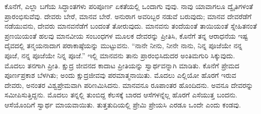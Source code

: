 ಕೊನೆಗೆ, ಎಲ್ಲಾ ಬಗೆಯ ಸಿದ್ಧಾಂತಗಳು ಪರಿಪೂರ್ಣ ಏಕತೆಯಲ್ಲಿ ಒಂದಾಗು ವುವು. ನಾವು ಯಾವಾಗಲೂ ದ್ವೈತಿಗಳಂತೆ ಪ್ರಾರಂಭಿಸುವೆವು. ದೇವರು ಬೇರೆ, ಮಾನವ ಬೇರೆ. ಅನುರಾಗ ಅವರಿಬ್ಬರ ನಡುವೆ ಬರುವುದು; ಮಾನವ ದೇವರೆಡೆಗೆ ನಡೆಯುವನು, ದೇವರು ಮಾನವನೆಡೆಗೆ ಬಂದಂತೆ ತೋರುವುದು. ಮಾನವನು ತಂದೆಯಂತೆ ತಾಯಿಯಂತೆ ಸ್ನೇಹಿತನಂತೆ ಪ್ರಣಯಿಯಂತೆ ಹಲವು ಮಾನವೀಯ ಸಂಬಂಧಗಳ ಮೂಲಕ ದೇವರನ್ನು ಪ್ರೀತಿಸಿ, ಕೊನೆಗೆ ತನ್ನ ಆರಾಧನೆಯ ಇಷ್ಟ ದೈವದಲ್ಲಿ ತನ್ಮಯನಾದಾಗ ಪರಾಕಾಷ್ಠೆಯನ್ನು ಮುಟ್ಟುವನು. “ನಾನೇ ನೀನು, ನೀನೇ ನಾನು, ನಿನ್ನ ಪೂಜೆಯೇ ನನ್ನ ಪೂಜೆ, ನನ್ನ ಪೂಜೆಯೇ ನಿನ್ನ ಪೂಜೆ.” ಇಲ್ಲಿ ಮಾನವನು ತಾನು ಪ್ರಾರಂಭಿಸಿದುದರ ಅಂತಿಮಗುರಿ ಸಿಕ್ಕುವುದು. ಮೊದಲು ತನಗಾಗಿ ಪ್ರೀತಿ. ಕ್ಷುದ್ರ ಜೀವನದ ಕಾದಾಟ ಪ್ರೀತಿಯನ್ನು ಸ್ವಾರ್ಥವನ್ನಾಗಿ ಮಾಡಿತು. ಕೊನೆಗೆ ಪ್ರೇಮದ ಪೂರ್ಣಪ್ರಕಾಶ ಬೆಳಗಿತು; ಅಂದು ಕ್ಷುದ್ರಜೀವವು ಪರಮಾತ್ಮನಾಯಿತು. ಮೊದಲು ಎಲ್ಲಿಯೋ ಹೊರಗೆ ಇರುವ ದೇವರು, ಅನಂತರ ವಿಶ್ವಪ್ರೇಮವಾಗಿ ಪರಿಣಮಿಸಿದನು. ಮಾನವನೂ ರೂಪಾಂತರ ಹೊಂದಿದನು. ಅವನೂ ದೇವರನ್ನು ಸಮೀಪಿಸುತ್ತಿದ್ದನು. ಮೊದಲು ತನ್ನಲ್ಲಿ ತುಂಬಿದ್ದ ಕೆಲಸಕ್ಕೆ ಬಾರದ ಆಸೆಗಳನ್ನೆಲ್ಲ ಹೊರಗೆ ಎಸೆಯುತ್ತ ಬಂದನು. ಆಸೆಯೊಂದಿಗೆ ಸ್ವಾರ್ಥ ಮಾಯವಾಯಿತು. ತುತ್ತತುದಿಯಲ್ಲಿ ಪ್ರೇಮಿ ಪ್ರೇಯಸಿ ಎರಡೂ ಒಂದೇ ಎಂದು ಕಂಡವು.

